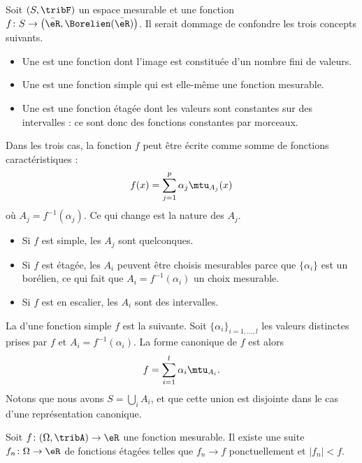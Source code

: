 \begin{definition}\label{DefBPCxdel}
    Soit \( (S,\tribF)\) un espace mesurable et une fonction \( f\colon S\to \big( \bar\eR,\Borelien(\bar\eR) \big)\). Il serait dommage de confondre les trois concepts suivants.
    \begin{itemize}
        \item
    Une  est une fonction dont l'image est constituée d'un nombre fini de valeurs.
\item
    Une  est une fonction simple qui est elle-même une fonction mesurable.
\item
    Une  est une fonction étagée dont les valeurs sont constantes sur des intervalles : ce sont donc des fonctions constantes par morceaux.
    \end{itemize}
\end{definition}

Dans les trois cas, la fonction \( f\) peut être écrite comme somme de fonctions caractéristiques :
\begin{equation}
    f(x)=\sum_{j=1}^p\alpha_j\mtu_{A_j}(x)
\end{equation}
où \( A_j=f^{-1}(\alpha_j)\). Ce qui change est la nature des \( A_j\).

\begin{itemize}
    \item Si \( f\) est  simple, les \( A_j\) sont quelconques.
    \item Si \( f\) est étagée, les \( A_i\) peuvent être choisis mesurables parce que \( \{\alpha_i \}\) est un borélien, ce qui fait que \( A_i=f^{-1}(\alpha_i)\) un choix mesurable.
    \item Si \( f\) est en escalier, les \( A_i\) sont des intervalles.
\end{itemize}

La  d'une fonction simple \( f\) est la suivante. Soit \( \{ \alpha_i \}_{i=1,\ldots, l}\) les valeurs distinctes prises par \( f\) et \( A_i=f^{-1}(\alpha_i)\). La forme canonique de \( f\) est alors
\begin{equation}
    f=\sum_{i=1}^l\alpha_i\mtu_{A_i}.
\end{equation}
Notons que nous avons \( S=\bigcup_iA_i\), et que cette union est disjointe dans le cas d'une représentation canonique.

\begin{lemma}    \label{LemYFoWqmS}
    Soit \( f\colon (\Omega,\tribA)\to \eR\) une fonction mesurable. Il existe une suite \( f_n\colon \Omega\to \eR\) de fonctions étagées telles que \( f_n\to f\) ponctuellement et \( | f_n |<f\).
\end{lemma}

